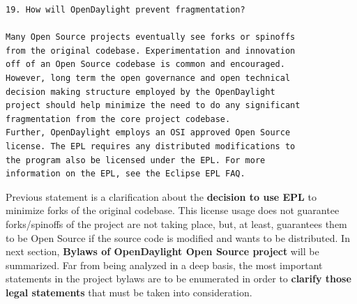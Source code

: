 \documentclass[a4paper, 12pt]{book}
\begin{document}
\begin{verbatim}
19. How will OpenDaylight prevent fragmentation?

Many Open Source projects eventually see forks or spinoffs
from the original codebase. Experimentation and innovation
off of an Open Source codebase is common and encouraged.
However, long term the open governance and open technical
decision making structure employed by the OpenDaylight
project should help minimize the need to do any significant
fragmentation from the core project codebase.
Further, OpenDaylight employs an OSI approved Open Source
license. The EPL requires any distributed modifications to
the program also be licensed under the EPL. For more
information on the EPL, see the Eclipse EPL FAQ.
\end{verbatim}
\noindent Previous statement is a clarification about the \textbf{decision to use EPL} to minimize forks of the original codebase. This license usage does not guarantee forks/spinoffs of the project are not taking place, but, at least, guarantees them to be Open Source if the source code is modified and wants to be distributed. In next section, \textbf{Bylaws of OpenDaylight Open Source project} will be summarized. Far from being analyzed in a deep basis, the most important statements in the project bylaws are to be enumerated in order to \textbf{clarify those legal statements} that must be taken into consideration.
\end{document}
